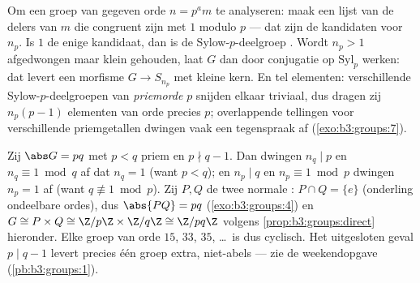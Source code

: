 \begin{method}\label{met:b3:groups:sylowmethod}
Om een groep van gegeven orde $n = p^a m$ te analyseren: maak een
lijst van de delers van $m$ die congruent zijn met $1$ modulo $p$
--- dat zijn de kandidaten voor $n_p$. Is $1$ de enige kandidaat,
dan is de Sylow-$p$-deelgroep . Wordt $n_p > 1$ afgedwongen
maar klein gehouden, laat $G$ dan door conjugatie op
$\mathrm{Syl}_p$ werken: dat levert een morfisme $G \to S_{n_p}$
met kleine kern. En tel elementen: verschillende
Sylow-$p$-deelgroepen van \emph{priemorde} $p$ snijden elkaar
triviaal, dus dragen zij $n_p(p-1)$ elementen van orde precies $p$;
overlappende tellingen voor verschillende priemgetallen dwingen
vaak een tegenspraak af (\cref{exo:b3:groups:7}).
\end{method}

\begin{example}\label{ex:b3:groups:pq}
Zij $\abs G = pq$ met $p < q$ priem en $p \nmid q - 1$. Dan dwingen
$n_q \mid p$ en $n_q \equiv 1 \bmod q$ af dat $n_q = 1$ (want $p <
q$); en $n_p \mid q$ en $n_p \equiv 1 \bmod p$ dwingen $n_p = 1$ af
(want $q \not\equiv 1 \bmod p$). Zij $P, Q$ de twee normale
: $P \cap Q = \{e\}$ (onderling ondeelbare ordes),
dus $\abs{PQ} = pq$ (\cref{exo:b3:groups:4}) en $G \cong P \times Q
\cong \Z/p\Z \times \Z/q\Z \cong \Z/pq\Z$ volgens
\cref{prop:b3:groups:direct} hieronder. Elke groep van orde $15$,
$33$, $35$, \dots\ is dus cyclisch. Het uitgesloten geval $p \mid q
- 1$ levert precies één groep extra, niet-abels --- zie de
weekendopgave (\cref{pb:b3:groups:1}).
\end{example}

